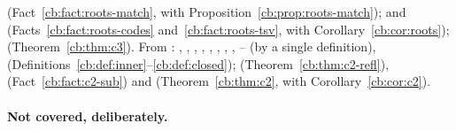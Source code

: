  (Fact~\ref{cb:fact:roots-match}, with Proposition~\ref{cb:prop:roots-match});
 and  (Facts~\ref{cb:fact:roots-codes} and~\ref{cb:fact:roots-tsv}, with
Corollary~\ref{cb:cor:roots});  (Theorem~\ref{cb:thm:c3}). From
: , , , , ,
, , , -- (by a single definition), 
(Definitions~\ref{cb:def:inner}--\ref{cb:def:closed});  (Theorem~\ref{cb:thm:c2-refl}),
 (Fact~\ref{cb:fact:c2-sub}) and  (Theorem~\ref{cb:thm:c2}, with
Corollary~\ref{cb:cor:c2}).

\paragraph{Not covered, deliberately.}
